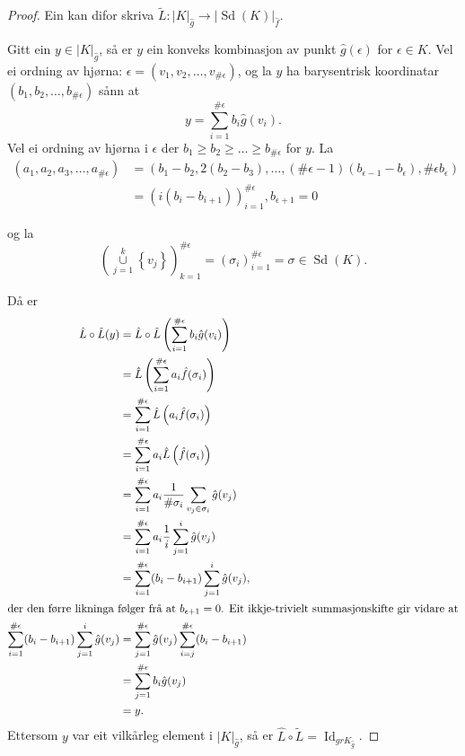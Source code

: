 \documentclass[a4paper, 12pt, norsk]{article}
\theoremstyle{plain}
\theoremstyle{definition}
\newcommand{\union}{ \mathop{\cup}\limits }
\newcommand{\gr}[1]{ \lvert #1 \rvert } %
\newcommand{\set}[1]{ \left\{ #1 \right\} } %
\newcommand{\tuple}[1]{ \left( #1 \right) } %
\DeclareMathOperator{\Sd}{Sd} %
\DeclareMathOperator{\Id}{Id} %
\begin{document}
\begin{proof}
	Ein kan difor skriva \( \tilde{L}: \gr{K}_{\hat{g}} \to \gr{\Sd(K)}_{\hat{f}} \).

	Gitt ein \( y \in \gr{K}_{\hat{g}} \), så er \( y \) ein konveks kombinasjon av punkt \( \hat{g}(\epsilon) \) for \( \epsilon \in K \). Vel ei ordning av hjørna: \( \epsilon = (v_1, v_2, \dots, v_{\#\epsilon}) \), og la \( y \) ha barysentrisk koordinatar \( (b_1, b_2, \dots, b_{\#\epsilon}) \) sånn at
	\[
		y = \sum_{i = 1}^{\#\epsilon} b_i \hat{g}(v_i).
	\]
	Vel ei ordning av hjørna i \( \epsilon \) der \( b_1 \geq b_2 \geq \dots \geq b_{\#\epsilon} \) for \( y \). La 
	\begin{align*}
		(a_1, a_2, a_3, \dots, a_{\#\epsilon}) &= \left( b_1-b_2, 2(b_2-b_3), \dots, (\#\epsilon-1)(b_{\epsilon-1}-b_{\epsilon}), \#\epsilon b_{\epsilon} \right) \\
		&= \left( i (b_i-b_{i+1}) \right)_{i=1}^{\#\epsilon}, b_{\epsilon+1} = 0
	\end{align*}
		
	og la 
	\[ 
		\left(\union_{j = 1}^{k} \set{v_j} \right)_{k=1}^{\#\epsilon} = (\sigma_i)_{i=1}^{\#\epsilon}=\sigma \in \Sd(K).
	\]

	Då er
	\begin{align*} %
		\hat{L}\circ\tilde{L}(y) &= \hat{L}\circ\tilde{L}\tuple{\sum_{i=1}^{\#\epsilon} b_i \hat{g}(v_i)} \\
		&= \hat{L}\left( \sum_{i=1}^{\#\epsilon} a_i \hat{f}(\sigma_i) \right) \\
		&= \sum_{i=1}^{\#\epsilon} \hat{L} \left( a_i \hat{f}(\sigma_i) \right) \\
		&= \sum_{i=1}^{\#\epsilon} a_i \hat{L} \left( \hat{f}(\sigma_i) \right) \\
		&= \sum_{i=1}^{\#\epsilon} a_i \frac{1}{\#\sigma_i} \sum_{v_j \in \sigma_i} \hat{g}(v_j) \\
		&= \sum_{i=1}^{\#\epsilon} a_i \frac{1}{i} \sum_{j = 1}^{i} \hat{g}(v_j) \\
		&= \sum_{i=1}^{\#\epsilon} (b_{i}-b_{i+1}) \sum_{j = 1}^{i} \hat{g}(v_j), \\
		\intertext{der den førre likninga følger frå at \( b_{\epsilon+1} = 0 \). Eit ikkje-trivielt summasjonskifte gir vidare at}
		\sum_{i=1}^{\#\epsilon} (b_{i}-b_{i+1}) \sum_{j = 1}^{i} \hat{g}(v_j) &= \sum_{j=1}^{\#\epsilon} \hat{g}(v_j) \sum_{i = j}^{\#\epsilon} (b_{i}-b_{i+1}) \\
		&= \sum_{j=1}^{\#\epsilon} b_i \hat{g}(v_j) \\
		&= y.
	\end{align*}
	Ettersom \( y \) var eit vilkårleg element i \( \gr{K}_{\hat{g}} \), så er \( \hat{L}\circ\tilde{L} = \Id_{gr{K}_{\hat{g}}} \).


\end{proof}
\end{document}
